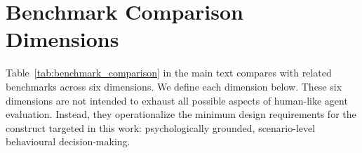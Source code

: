 












\section{Benchmark Comparison Dimensions}
\label{app:benchmark_dims}

Table~\ref{tab:benchmark_comparison} in the main text compares \ourbench with related benchmarks across six dimensions. We define each dimension below. These six dimensions are not intended to exhaust all possible aspects of human-like agent evaluation. Instead, they operationalize the minimum design requirements for the construct targeted in this work: psychologically grounded, scenario-level behavioural decision-making.

